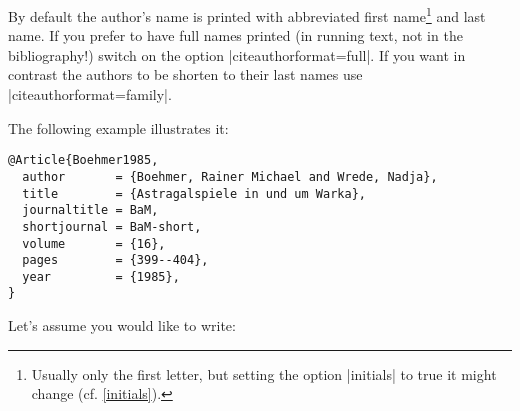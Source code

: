 \documentclass[a4paper,
10pt,
greek,
french,
spanish,
italian,
ngerman,
english
]{ltxdoc}
\begin{document}
By default the author's name is printed with abbreviated first name\footnote{Usually only the first letter, but setting the option |initials| to true it might change (cf. \cref{initials}).} and last name.
If you prefer to have full names printed (in running text, not in the bibliography!) switch on the option |citeauthorformat=full|.
If you want in contrast the authors to be shorten to their last names use |citeauthorformat=family|.

The following example illustrates it:

\begin{lstlisting}[style=bibentry,label=Boehmer1985,caption={{@}Article\{Boehmer1985,…\} }]
@Article{Boehmer1985,
  author       = {Boehmer, Rainer Michael and Wrede, Nadja},
  title        = {Astragalspiele in und um Warka},
  journaltitle = BaM,
  shortjournal = BaM-short,
  volume       = {16},
  pages        = {399--404},
  year         = {1985},
}
\end{lstlisting}

Let's assume you would like to write:
\end{document}
